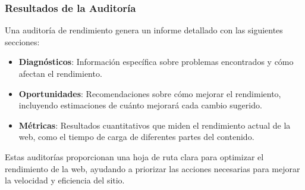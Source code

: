 \subsubsection{Resultados de la Auditoría}
Una auditoría de rendimiento genera un informe detallado con las siguientes secciones:
\begin{itemize}
	\item \textbf{Diagnósticos}: Información específica sobre problemas encontrados y cómo afectan el rendimiento.
	\item \textbf{Oportunidades}: Recomendaciones sobre cómo mejorar el rendimiento, incluyendo estimaciones de cuánto mejorará cada cambio sugerido.
	\item \textbf{Métricas}: Resultados cuantitativos que miden el rendimiento actual de la web, como el tiempo de carga de diferentes partes del contenido.
\end{itemize}
Estas auditorías proporcionan una hoja de ruta clara para optimizar el rendimiento de la web, ayudando a priorizar las acciones necesarias para mejorar la velocidad y eficiencia del sitio.
